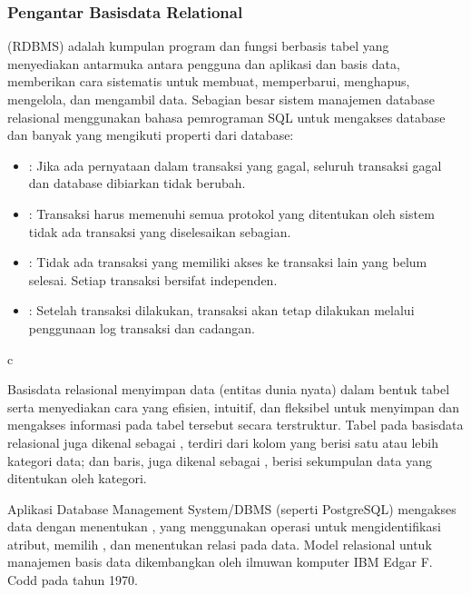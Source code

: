 \documentclass[letterpaper,10pt,english]{sphinxmanual}
\begin{document}
\subsubsection{Pengantar Basisdata Relational}
\label{\detokenize{sesi2/relationaldb:pengantar-basisdata-relational}}
 (RDBMS) adalah kumpulan program dan fungsi berbasis tabel yang menyediakan antarmuka antara pengguna dan aplikasi dan basis data, memberikan cara sistematis untuk membuat, memperbarui, menghapus, mengelola, dan mengambil data. Sebagian besar sistem manajemen database relasional menggunakan bahasa pemrograman SQL untuk mengakses database dan banyak yang mengikuti properti  dari database:
\begin{itemize}
\item {} 
: Jika ada pernyataan dalam transaksi yang gagal, seluruh transaksi gagal dan database dibiarkan tidak berubah.

\item {} 
: Transaksi harus memenuhi semua protokol yang ditentukan oleh sistem \sphinxhyphen{} tidak ada transaksi yang diselesaikan sebagian.

\item {} 
: Tidak ada transaksi yang memiliki akses ke transaksi lain yang belum selesai. Setiap transaksi bersifat independen.

\item {} 
: Setelah transaksi dilakukan, transaksi akan tetap dilakukan melalui penggunaan log transaksi dan cadangan.

\end{itemize}

c

Basisdata relasional menyimpan data (entitas dunia nyata) dalam bentuk tabel serta menyediakan cara yang efisien, intuitif, dan fleksibel untuk menyimpan dan mengakses informasi pada tabel tersebut secara terstruktur. Tabel pada basisdata relasional juga dikenal sebagai , terdiri dari kolom yang berisi satu atau lebih kategori data; dan baris, juga dikenal sebagai , berisi sekumpulan data yang ditentukan oleh kategori.

Aplikasi Database Management System/DBMS (seperti PostgreSQL) mengakses data dengan menentukan , yang menggunakan operasi untuk mengidentifikasi atribut, memilih , dan menentukan relasi pada data. Model relasional untuk manajemen basis data dikembangkan oleh ilmuwan komputer IBM Edgar F. Codd pada tahun 1970.
\end{document}
